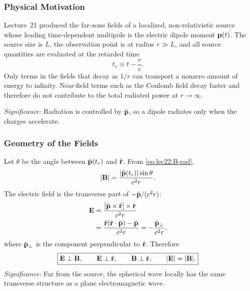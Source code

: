 \subsubsection*{Physical Motivation}
Lecture~21 produced the far-zone fields of a localized, non-relativistic source whose
leading time-dependent multipole is the electric dipole moment $\mathbf{p}(t)$. The
source size is $L$, the observation point is at radius $r\gg L$, and all source
quantities are evaluated at the retarded time
\begin{equation}\label{eq:lec22:retarded-time}
  t_r \equiv t-\frac{r}{c}.
\end{equation}
Only terms in the fields that decay as $1/r$ can transport a nonzero amount of energy
to infinity. Near-field terms such as the Coulomb field decay faster and therefore do
not contribute to the total radiated power at $r\to\infty$.


\textit{Significance:} Radiation is controlled by $\ddot{\mathbf{p}}$, so a dipole
radiates only when the charges accelerate.

\subsubsection*{Geometry of the Fields}
Let $\theta$ be the angle between $\ddot{\mathbf{p}}(t_r)$ and $\hat{\mathbf{r}}$. From
\eqref{eq:lec22:B-rad},
\begin{equation}\label{eq:lec22:B-magnitude}
  |\mathbf{B}|=\frac{|\ddot{\mathbf{p}}(t_r)|\sin\theta}{c^2 r}.
\end{equation}
The electric field is the transverse part of $-\ddot{\mathbf{p}}/(c^2r)$:
\begin{align}
  \mathbf{E}
  &= \frac{\qty[\ddot{\mathbf{p}}\times\hat{\mathbf{r}}]\times\hat{\mathbf{r}}}{c^2 r} \notag\\
  &= \frac{\hat{\mathbf{r}}\qty(\hat{\mathbf{r}}\cdot\ddot{\mathbf{p}})-\ddot{\mathbf{p}}}{c^2 r}
   = -\frac{\ddot{\mathbf{p}}_{\perp}}{c^2 r},
  \label{eq:lec22:E-transverse}
\end{align}
where $\ddot{\mathbf{p}}_{\perp}$ is the component perpendicular to $\hat{\mathbf{r}}$. Therefore
\begin{equation}\label{eq:lec22:E-B-triad}
  \boxed{\mathbf{E}\perp\mathbf{B},\qquad \mathbf{E}\perp\hat{\mathbf{r}},\qquad \mathbf{B}\perp\hat{\mathbf{r}},
  \qquad |\mathbf{E}|=|\mathbf{B}|.}
\end{equation}
\textit{Significance:} Far from the source, the spherical wave locally has the same
transverse structure as a plane electromagnetic wave.

